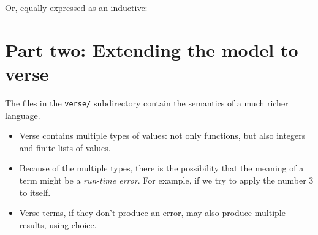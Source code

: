 \documentclass{article}
\theoremstyle{definition}
\newcommand{\codeplus}[3]{%
  }
\begin{document}
Or, equally expressed as an inductive:

\codeplus{../coq/simple/model.v}{APPLY}{} 




\section{Part two: Extending the model to verse}

The files in the  \texttt{verse/} subdirectory contain the semantics of a much richer language.

\begin{itemize}
\item Verse contains multiple types of values: not only functions, but also integers and finite lists of values.
\item Because of the multiple types, there is the possibility
that the meaning of a term might be a \emph{run-time error}. For
example, if we try to apply the number 3 to itself.
\item Verse terms, if they don't produce an error, may also 
  produce multiple results, using choice.
\end{itemize}
\end{document}
